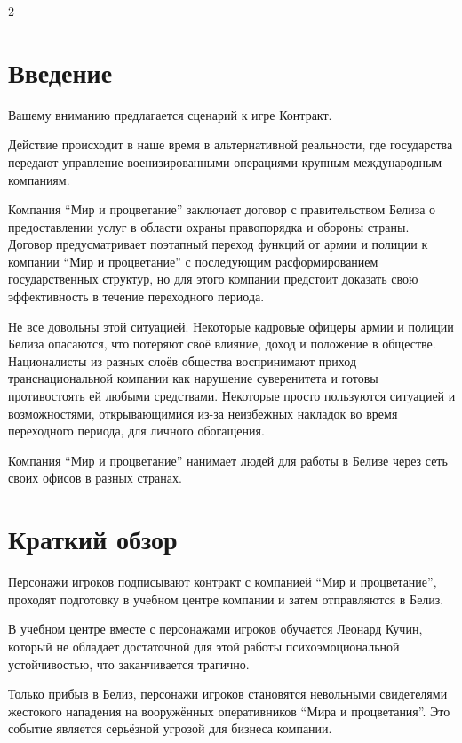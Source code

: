 \documentclass[twoside]{article}
\begin{document}
\begin{multicols}{2}
\raggedcolumns{}

\renewcommand{\contentsname}{Содержание}
\pagestyle{empty}
\tableofcontents
\clearpage
\pagestyle{plain}

\section{Введение}\label{intro}

Вашему вниманию предлагается сценарий к игре Контракт.

Действие происходит в наше время в альтернативной реальности, где
государства передают управление военизированными операциями крупным
международным компаниям.

Компания \enquote{Мир и процветание} заключает договор с правительством Белиза о
предоставлении услуг в области охраны правопорядка и обороны страны.
Договор предусматривает поэтапный переход функций от армии и полиции к
компании \enquote{Мир и процветание} с последующим расформированием
государственных структур, но для этого компании предстоит доказать свою
эффективность в течение переходного периода.

Не все довольны этой ситуацией. Некоторые кадровые офицеры армии и
полиции Белиза опасаются, что потеряют своё влияние, доход и положение в
обществе. Националисты из разных слоёв общества воспринимают приход
транснациональной компании как нарушение суверенитета и готовы
противостоять ей любыми средствами. Некоторые просто пользуются
ситуацией и возможностями, открывающимися из-за неизбежных накладок во
время переходного периода, для личного обогащения.

Компания \enquote{Мир и процветание} нанимает людей для работы в Белизе через
сеть своих офисов в разных странах.

\section{Краткий обзор}\label{overview}

Персонажи игроков подписывают контракт с компанией \enquote{Мир и процветание},
проходят подготовку в учебном центре компании и затем отправляются в
Белиз.

В учебном центре вместе с персонажами игроков обучается Леонард Кучин,
который не обладает достаточной для этой работы психоэмоциональной
устойчивостью, что заканчивается трагично.

Только прибыв в Белиз, персонажи игроков становятся невольными
свидетелями жестокого нападения на вооружённых оперативников \enquote{Мира и
процветания}. Это событие является серьёзной угрозой для бизнеса
компании.


\end{multicols}
\end{document}
